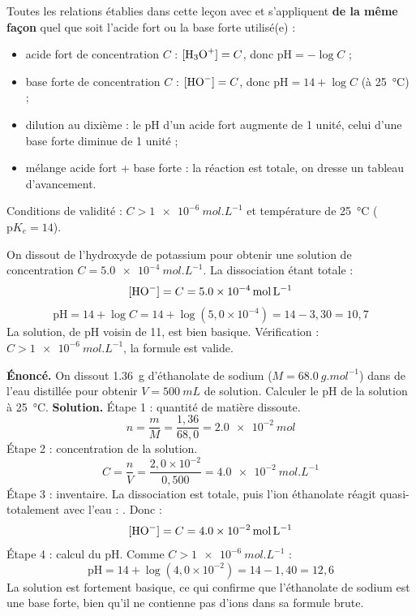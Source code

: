 \documentclass[11pt]{article}
\newcounter{popsec}
\newcounter{popsub}
\newcommand{\courssub}[1]{%
  \stepcounter{popsub}%
  \par\vspace{9pt}\noindent{\popxbold\fontsize{11.5}{13}\selectfont\color{popink}{\color{poporange}\thepopsec.\thepopsub}\hspace{6pt}#1}\par\nopagebreak\vspace{4pt}
}
\begin{document}
\courssub{Généralisation des relations de pH}

\begin{aretenir}
Toutes les relations établies dans cette leçon avec  et  s'appliquent \textbf{de la même façon} quel que soit l'acide fort ou la base forte utilisé(e) :
\begin{itemize}
\item acide fort de concentration $C$ : $[\ce{H3O+}] = C$, donc $\mathrm{pH} = -\log C$ ;
\item base forte de concentration $C$ : $[\ce{HO-}] = C$, donc $\mathrm{pH} = 14 + \log C$ (à \SI{25}{\celsius}) ;
\item dilution au dixième : le pH d'un acide fort augmente de 1 unité, celui d'une base forte diminue de 1 unité ;
\item mélange acide fort + base forte : la réaction  est totale, on dresse un tableau d'avancement.
\end{itemize}
Conditions de validité : $C > \SI{1e-6}{mol.L^{-1}}$ et température de \SI{25}{\celsius} ($\mathrm{p}K_e = 14$).
\end{aretenir}

\begin{exemplebox}
On dissout de l'hydroxyde de potassium pour obtenir une solution de concentration $C = \SI{5,0e-4}{mol.L^{-1}}$. La dissociation  étant totale :
\[ [\ce{HO-}] = C = \SI{5,0e-4}{mol.L^{-1}} \]
\[ \mathrm{pH} = 14 + \log C = 14 + \log(5{,}0 \times 10^{-4}) = 14 - 3{,}30 = 10{,}7 \]
La solution, de pH voisin de 11, est bien basique. Vérification : $C > \SI{1e-6}{mol.L^{-1}}$, la formule est valide.
\end{exemplebox}

\begin{exoresolu}
\textbf{Énoncé.} On dissout \SI{1,36}{g} d'éthanolate de sodium  ($M = \SI{68,0}{g.mol^{-1}}$) dans de l'eau distillée pour obtenir $V = \SI{500}{mL}$ de solution. Calculer le pH de la solution à \SI{25}{\celsius}.
\tcblower
\textbf{Solution.} Étape 1 : quantité de matière dissoute.
\[ n = \frac{m}{M} = \frac{1{,}36}{68{,}0} = \SI{2,0e-2}{mol} \]
Étape 2 : concentration de la solution.
\[ C = \frac{n}{V} = \frac{2{,}0 \times 10^{-2}}{0{,}500} = \SI{4,0e-2}{mol.L^{-1}} \]
Étape 3 : inventaire. La dissociation  est totale, puis l'ion éthanolate réagit quasi-totale\-ment avec l'eau : . Donc :
\[ [\ce{HO-}] = C = \SI{4,0e-2}{mol.L^{-1}} \]
Étape 4 : calcul du pH. Comme $C > \SI{1e-6}{mol.L^{-1}}$ :
\[ \mathrm{pH} = 14 + \log(4{,}0 \times 10^{-2}) = 14 - 1{,}40 = 12{,}6 \]
La solution est fortement basique, ce qui confirme que l'éthanolate de sodium est une base forte, bien qu'il ne contienne pas d'ions  dans sa formule brute.
\end{exoresolu}
\end{document}
